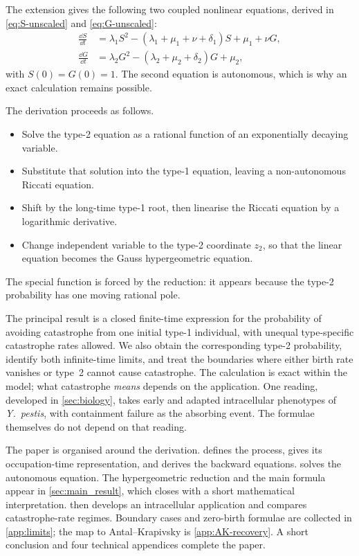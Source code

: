 The extension gives the following two coupled nonlinear equations, derived in \eqref{eq:S-unscaled} and \eqref{eq:G-unscaled}:
\begin{align*}
\frac{\dd S}{\dd t}
&=\lambda_1S^2-(\lambda_1+\mu_1+\nu+\delta_1)S
+\mu_1+\nu G,\\
\frac{\dd G}{\dd t}
&=\lambda_2G^2-(\lambda_2+\mu_2+\delta_2)G
+\mu_2,
\end{align*}
with $S(0)=G(0)=1$. The second equation is autonomous, which is why an exact calculation remains possible.

\begin{samepage}
The derivation proceeds as follows.
\begin{itemize}[leftmargin=1.6em,itemsep=0.25em,topsep=0.35em]
\item Solve the type-2 equation as a rational function of an exponentially decaying variable.
\item Substitute that solution into the type-1 equation, leaving a non-autonomous Riccati equation.
\item Shift by the long-time type-1 root, then linearise the Riccati equation by a logarithmic derivative.
\item Change independent variable to the type-2 coordinate $z_2$, so that the linear equation becomes the Gauss hypergeometric equation.
\end{itemize}
The special function is forced by the reduction: it appears because the type-2 probability has one moving rational pole.
\end{samepage}

The principal result is a closed finite-time expression for the probability of avoiding catastrophe from one initial type-1 individual, with unequal type-specific catastrophe rates allowed. We also obtain the corresponding type-2 probability, identify both infinite-time limits, and treat the boundaries where either birth rate vanishes or type~2 cannot cause catastrophe. The calculation is exact within the model; what catastrophe \emph{means} depends on the application. One reading, developed in \cref{sec:biology}, takes early and adapted intracellular phenotypes of \textit{Y.\ pestis}, with containment failure as the absorbing event. The formulae themselves do not depend on that reading.

The paper is organised around the derivation.  defines the process, gives its occupation-time representation, and derives the backward equations.  solves the autonomous equation. The hypergeometric reduction and the main formula appear in \cref{sec:main_result}, which closes with a short mathematical interpretation.  then develops an intracellular application and compares catastrophe-rate regimes. Boundary cases and zero-birth formulae are collected in \cref{app:limits}; the map to Antal--Krapivsky is \cref{app:AK-recovery}. A short conclusion and four technical appendices complete the paper.
